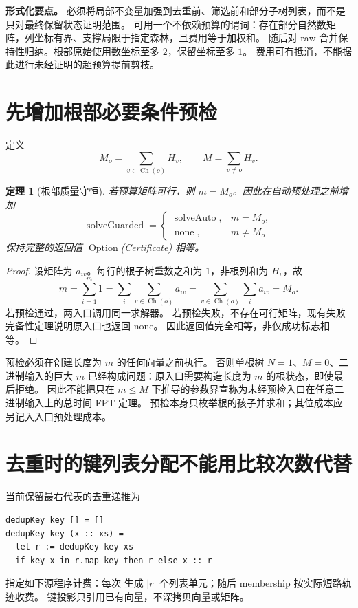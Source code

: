 \documentclass[UTF8,11pt,a4paper]{ctexart}
\newtheorem{theorem}{定理}[section]
\theoremstyle{definition}
\newcommand{\ch}{\operatorname{Ch}}
\newcommand{\abs}[1]{\left|#1\right|}
\newcommand{\code}[1]{\texttt{\detokenize{#1}}}
\begin{document}
\noindent\textbf{形式化要点。}
必须将局部不变量加强到去重前、筛选前和部分子树列表，而不是只对最终保留状态证明范围。
可用一个不依赖预算的谓词：存在部分自然数矩阵，列坐标有界、支撑局限于指定森林，且费用等于加权和。
随后对 raw 合并保持性归纳。根部原始使用数坐标至多 $2$，保留坐标至多 $1$。
费用可有抵消，不能据此进行未经证明的超预算提前剪枝。

\section{先增加根部必要条件预检}
定义
\[
 M_o=\sum_{v\in\ch(o)}H_v,\qquad M=\sum_{v\ne o}H_v.
\]
\begin{theorem}[根部质量守恒]\label{thm:guard}
若预算矩阵可行，则 $m=M_o$。因此在自动预处理之前增加
\[
 \operatorname{solveGuarded}=
 \begin{cases}
 \operatorname{solveAuto},&m=M_o,\\
 \operatorname{none},&m\ne M_o
 \end{cases}
\]
保持完整的返回值 $\operatorname{Option}$(Certificate) 相等。
\end{theorem}
\begin{proof}
设矩阵为 $a_{iv}$。每行的根子树重数之和为 $1$，非根列和为 $H_v$，故
\[
 m=\sum_{i=1}^{m}1
 =\sum_i\sum_{v\in\ch(o)}a_{iv}
 =\sum_{v\in\ch(o)}\sum_i a_{iv}=M_o.
\]
若预检通过，两入口调用同一求解器。
若预检失败，不存在可行矩阵，现有失败完备性定理说明原入口也返回 none。
因此返回值完全相等，非仅成功标志相等。
\end{proof}

预检必须在创建长度为 $m$ 的任何向量之前执行。
否则单根树 $N=1$、$M=0$、二进制输入的巨大 $m$ 已经构成问题：原入口需要构造长度为 $m$ 的根状态，即使最后拒绝。
因此不能把只在 $m\le M$ 下推导的参数界宣称为未经预检入口在任意二进制输入上的总时间 FPT 定理。
预检本身只枚举根的孩子并求和；其位成本应另记入入口预处理成本。

\section{去重时的键列表分配不能用比较次数代替}
当前保留最右代表的去重递推为
\begin{lstlisting}
dedupKey key [] = []
dedupKey key (x :: xs) =
  let r := dedupKey key xs
  if key x in r.map key then r else x :: r
\end{lstlisting}
指定如下源程序计费：每次 \code{r.map key} 生成 $\abs r$ 个列表单元；随后 membership 按实际短路轨迹收费。
键投影只引用已有向量，不深拷贝向量或矩阵。
\end{document}
